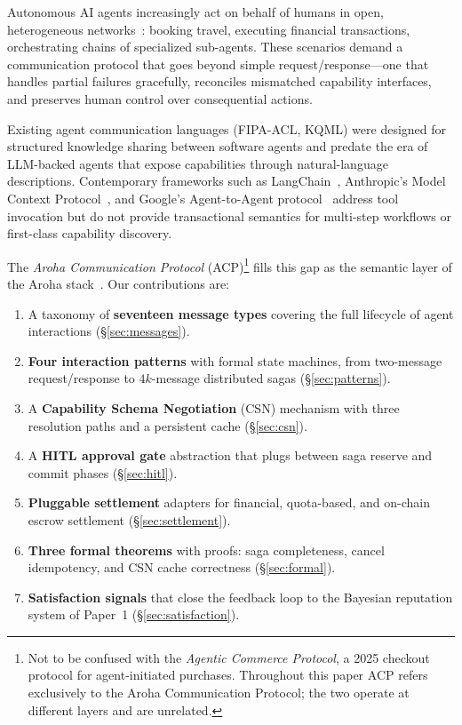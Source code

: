 \documentclass[conference]{IEEEtran}
\begin{document}
Autonomous AI agents increasingly act on behalf of humans in
open, heterogeneous networks~\cite{guo2024agents}: booking travel,
executing financial transactions, orchestrating chains of specialized
sub-agents.  These scenarios demand a communication protocol that
goes beyond simple request/response—one that handles partial failures
gracefully, reconciles mismatched capability interfaces, and preserves
human control over consequential actions.

Existing agent communication languages (FIPA-ACL, KQML) were designed
for structured knowledge sharing between software agents and predate
the era of LLM-backed agents that expose capabilities through
natural-language descriptions.  Contemporary frameworks such as
LangChain~\cite{harrison2022langchain}, Anthropic's Model Context
Protocol~\cite{anthropic2024mcp}, and Google's Agent-to-Agent
protocol~\cite{google2024a2a} address tool invocation but do not
provide transactional semantics for multi-step workflows or
first-class capability discovery.

The \emph{Aroha Communication Protocol}
(ACP)\footnote{Not to be confused with the \emph{Agentic Commerce
Protocol}, a 2025 checkout protocol for agent-initiated purchases.
Throughout this paper ACP refers exclusively to the Aroha
Communication Protocol; the two operate at different layers and are
unrelated.} fills this gap as the
semantic layer of the Aroha stack~\cite{aroha2025p5}.  Our
contributions are:
\begin{enumerate}
  \item A taxonomy of \textbf{seventeen message types} covering the full
        lifecycle of agent interactions (\S\ref{sec:messages}).
  \item \textbf{Four interaction patterns} with formal state machines,
        from two-message request/response to $4k$-message distributed
        sagas (\S\ref{sec:patterns}).
  \item A \textbf{Capability Schema Negotiation} (CSN) mechanism with
        three resolution paths and a persistent cache
        (\S\ref{sec:csn}).
  \item A \textbf{HITL approval gate} abstraction that plugs between
        saga reserve and commit phases (\S\ref{sec:hitl}).
  \item \textbf{Pluggable settlement} adapters for financial,
        quota-based, and on-chain escrow settlement
        (\S\ref{sec:settlement}).
  \item \textbf{Three formal theorems} with proofs: saga completeness,
        cancel idempotency, and CSN cache correctness
        (\S\ref{sec:formal}).
  \item \textbf{Satisfaction signals} that close the feedback loop
        to the Bayesian reputation system of Paper~1
        (\S\ref{sec:satisfaction}).
\end{enumerate}
\end{document}

